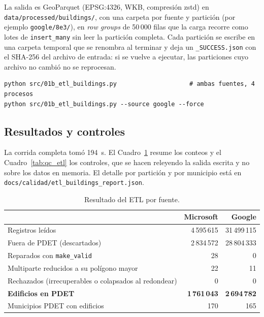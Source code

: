 La salida es GeoParquet (EPSG:4326, WKB, compresión zstd) en \texttt{data/processed/buildings/}, con una carpeta por fuente y partición (por ejemplo \texttt{google/8e3/}), en \emph{row groups} de 50\,000 filas que la carga recorre como lotes de \texttt{insert\_many} sin leer la partición completa. Cada partición se escribe en una carpeta temporal que se renombra al terminar y deja un \texttt{\_SUCCESS.json} con el SHA-256 del archivo de entrada: si se vuelve a ejecutar, las particiones cuyo archivo no cambió no se reprocesan.

\begin{lstlisting}[style=lab]
python src/01b_etl_buildings.py                    # ambas fuentes, 4 procesos
python src/01b_etl_buildings.py --source google --force
\end{lstlisting}

\subsection{Resultados y controles}
La corrida completa tomó 194~s. El Cuadro~\ref{tab:etl_edificios} resume los conteos y el Cuadro~\ref{tab:qc_etl} los controles, que se hacen releyendo la salida escrita y no sobre los datos en memoria. El detalle por partición y por municipio está en \texttt{docs/calidad/etl\_buildings\_report.json}.

\begin{table}[H]
\centering
\small
{}
\begin{tabularx}{\textwidth}{X r r}
\toprule
 & \textbf{Microsoft} & \textbf{Google} \\
\midrule
Registros leídos & 4\,595\,615 & 31\,499\,115 \\
Fuera de PDET (descartados) & 2\,834\,572 & 28\,804\,333 \\
Reparados con \texttt{make\_valid} & 28 & 0 \\
Multiparte reducidos a su polígono mayor & 22 & 11 \\
Rechazados (irrecuperables o colapsados al redondear) & 0 & 0 \\
\textbf{Edificios en PDET} & \textbf{1\,761\,043} & \textbf{2\,694\,782} \\
Municipios PDET con edificios & 170 & 165 \\
\bottomrule
\end{tabularx}
\caption{Resultado del ETL por fuente.}
\label{tab:etl_edificios}
\end{table}

